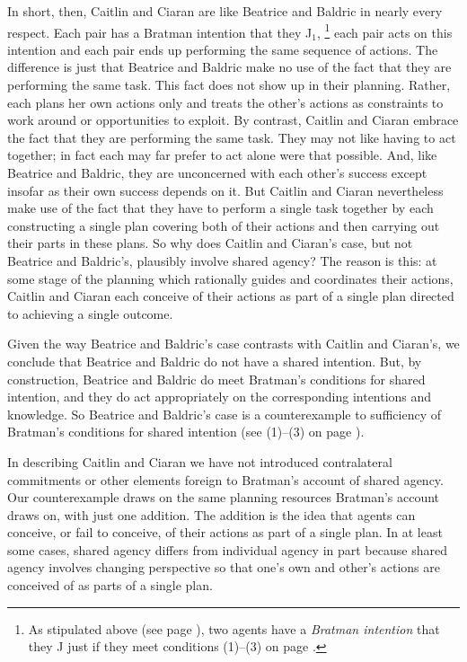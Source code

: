 \documentclass[12pt,\papersize]{extarticle}
\begin{document}
In short, then, Caitlin and Ciaran are like Beatrice and Baldric in nearly every respect. 
Each pair has a Bratman intention that they J$_1$,%
\footnote{
As stipulated above (see page \pageref*{df:bratman_intention}), 
two agents have a \emph{Bratman intention} that they J just if they meet conditions (1)--(3) on page \pageref{quote:bratman_account}.
}
%
 each pair acts on this intention and each pair ends up performing the same sequence of actions.
The difference is just that Beatrice and Baldric make no use of the fact that they are performing the same task.
	This fact does not show up in their planning. 
	Rather, each plans her own actions only and treats the other's actions as constraints to work around or opportunities to exploit.
By contrast, Caitlin and Ciaran embrace the fact that they are performing the same task. 
They may not like having to act together; in fact each may far prefer to act alone were that possible.
And, like Beatrice and Baldric, they are unconcerned with each other's success except insofar as their own success depends on it.
But Caitlin and Ciaran nevertheless make use of the fact that they have to perform a single task together by each constructing a single plan covering both of their actions and then carrying out their parts in these plans.
So why does Caitlin and Ciaran's case, but not Beatrice and Baldric's, plausibly involve shared agency?
The reason is  this:
	 at some stage of the planning which rationally guides and coordinates their actions,
	Caitlin and Ciaran each conceive of their actions as part of a single plan directed to achieving a single outcome.


Given the way Beatrice and Baldric's case contrasts with Caitlin and Ciaran's,
we conclude that Beatrice and Baldric do not have a shared intention.
But, by construction, 
 Beatrice and Baldric do meet Bratman's conditions for shared intention, and they do act appropriately on the corresponding intentions and knowledge. 
 So Beatrice and Baldric's case  is a counterexample to sufficiency of Bratman's conditions for shared intention (see (1)--(3) on page \pageref{quote:bratman_account}).


In describing Caitlin and Ciaran we have not introduced contralateral commitments or other elements foreign to Bratman's account of shared agency. 
Our counterexample draws on the same planning resources Bratman's account draws on, with just one addition.
The addition is the idea that agents can conceive, or fail to conceive, of their actions as part of a single plan. 
In at least some cases, shared agency differs from individual agency in part because shared agency involves changing perspective so that one’s own and other’s actions are conceived of as parts of a single plan.
\end{document}
